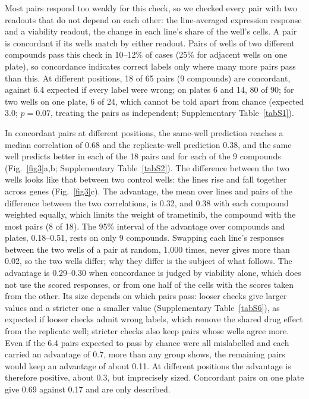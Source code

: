 \documentclass[pdflatex,sn-nature]{sn-jnl}
\begin{document}
Most pairs respond too weakly for this check, so we checked every pair with two readouts that do not depend on each other: the line-averaged expression response and a viability readout, the change in each line's share of the well's cells. A pair is concordant if its wells match by either readout. Pairs of wells of two different compounds pass this check in 10--12\% of cases (25\% for adjacent wells on one plate), so concordance indicates correct labels only where many more pairs pass than this. At different positions, 18 of 65 pairs (9 compounds) are concordant, against 6.4 expected if every label were wrong; on plates 6 and 14, 80 of 90; for two wells on one plate, 6 of 24, which cannot be told apart from chance (expected 3.0; $p=0.07$, treating the pairs as independent; Supplementary Table~\ref{tabS1}).

In concordant pairs at different positions, the same-well prediction reaches a median correlation of 0.68 and the replicate-well prediction 0.38, and the same well predicts better in each of the 18 pairs and for each of the 9 compounds (Fig.~\ref{fig3}a,b; Supplementary Table~\ref{tabS2}). The difference between the two wells looks like that between two control wells: the lines rise and fall together across genes (Fig.~\ref{fig3}c). The advantage, the mean over lines and pairs of the difference between the two correlations, is 0.32, and 0.38 with each compound weighted equally, which limits the weight of trametinib, the compound with the most pairs (8 of 18). The 95\% interval of the advantage over compounds and plates, 0.18--0.51, rests on only 9 compounds. Swapping each line's responses between the two wells of a pair at random, 1,000 times, never gives more than 0.02, so the two wells differ; why they differ is the subject of what follows. The advantage is 0.29--0.30 when concordance is judged by viability alone, which does not use the scored responses, or from one half of the cells with the scores taken from the other. Its size depends on which pairs pass: looser checks give larger values and a stricter one a smaller value (Supplementary Table~\ref{tabS6}), as expected if looser checks admit wrong labels, which remove the shared drug effect from the replicate well; stricter checks also keep pairs whose wells agree more. Even if the 6.4 pairs expected to pass by chance were all mislabelled and each carried an advantage of 0.7, more than any group shows, the remaining pairs would keep an advantage of about 0.11. At different positions the advantage is therefore positive, about 0.3, but imprecisely sized. Concordant pairs on one plate give 0.69 against 0.17 and are only described.
\end{document}
